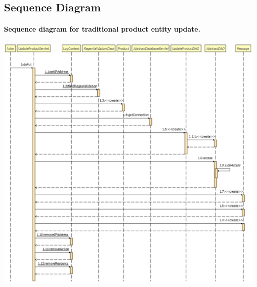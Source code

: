 \pagebreak
\subsection{Sequence Diagram}

\paragraph[]{Sequence diagram for traditional product entity update.} \hspace{1mm} \par
\includegraphics[width=\textwidth, keepaspectratio]{resources/updateproductsequence.pdf}
\pagebreak
